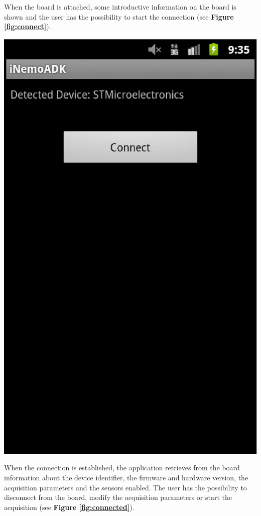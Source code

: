 When the board is attached, some introductive information on the board is shown and the user has the possibility to start the connection (see {\bf Figure \ref{fig:connect}}).

\begin{center}
	\includegraphics[width=0.6\linewidth]{pics/connect.eps}
	\label{fig:connect}
\end{center}

When the connection is established, the application retrieves from the board information about the device identifier, the firmware and hardware version, the acquisition parameters and the sensors enabled. The user has the possibility to disconnect from the board, modify the acquisition parameters or start the acquisition (see {\bf Figure \ref{fig:connected}}).

